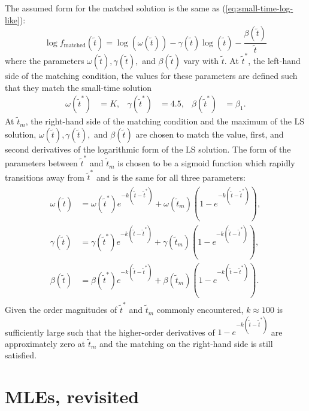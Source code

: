 The assumed form for the matched solution is the same as
(\ref{eq:small-time-log-like}):
\[
  \log f_{\mbox{matched}}(\tilde{t}) = \log(\omega(\tilde{t})) -
  \gamma(\tilde{t})\log(\tilde{t}) -
  \frac{\beta(\tilde{t})}{\tilde{t}}
\]
where the parameters $\omega(\tilde{t}), \gamma(\tilde{t}),$ and
$\beta(\tilde{t})$ vary with $\tilde{t}$. At $\tilde{t}^*$, the
left-hand side of the matching condition, the values for these
parameters are defined such that they match the small-time solution
\begin{align*}
  \omega(\tilde{t}^*) &= K, & \gamma(\tilde{t}^*) &= 4.5, & \beta(\tilde{t}^*) &= \beta_1.
\end{align*}
At $\tilde{t}_m$, the right-hand side of the matching condition and
the maximum of the LS solution,
$\omega(\tilde{t}), \gamma(\tilde{t}),$ and $\beta(\tilde{t})$ are
chosen to match the value, first, and second derivatives of the
logarithmic form of the LS solution. The form of the parameters
between $\tilde{t}^*$ and $\tilde{t}_m$ is chosen to be a sigmoid
function which rapidly transitions away from $\tilde{t}^*$ and is the
same for all three parameters:
\begin{align}
  \begin{split}
    \omega(\tilde{t}) &= \omega(\tilde{t}^*)e^{-k(\tilde{t}-\tilde{t}^*)} + \omega(\tilde{t}_m)\left(1-e^{-k(\tilde{t}-\tilde{t}^*)}\right), \\
    \gamma(\tilde{t}) &= \gamma(\tilde{t}^*)e^{-k(\tilde{t}-\tilde{t}^*)} + \gamma(\tilde{t}_m)\left(1-e^{-k(\tilde{t}-\tilde{t}^*)}\right), \\
    \beta(\tilde{t}) &= \beta(\tilde{t}^*)e^{-k(\tilde{t}-\tilde{t}^*)} + \beta(\tilde{t}_m)\left(1-e^{-k(\tilde{t}-\tilde{t}^*)}\right).
  \end{split}
\end{align}
Given the order magnitudes of $\tilde{t}^*$ and $\tilde{t}_m$ commonly
encountered, $k \approx 100$ is sufficiently large such that the
higher-order derivatives of $1-e^{-k(\tilde{t}-\tilde{t}^*)}$ are
approximately zero at $\tilde{t}_m$ and the matching on the right-hand
side is still satisfied.

\section{MLEs, revisited}

